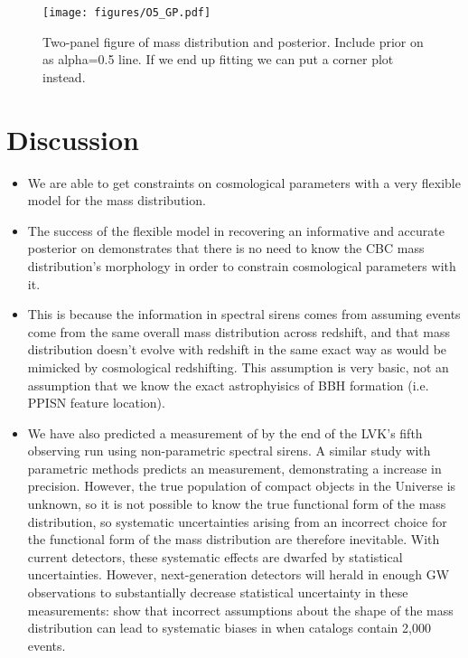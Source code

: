 \documentclass[]{aastex631}
\begin{document}
\begin{figure}
    \centering
    \texttt{[image: figures/O5\_GP.pdf]}
    \caption{Two-panel figure of mass distribution and \Ho{} posterior. 
    Include prior on \Ho{} as alpha=0.5 line. 
    If we end up fitting \Omm{} we can put a corner plot instead.}
    \label{fig:O5_GP}
\end{figure}


\section{Discussion}
\label{sec:discussion}


\begin{itemize}
    \item We are able to get constraints on cosmological parameters with a very flexible model for the mass distribution. 
    \item The success of the flexible model in recovering an informative and accurate posterior on \Ho demonstrates that there is no need to know the CBC mass distribution's morphology in order to constrain cosmological parameters with it.
    \item This is because the information in spectral sirens comes from assuming events come from the same overall mass distribution across redshift, and that mass distribution doesn't evolve with redshift in the same exact way as would be mimicked by cosmological redshifting. This assumption is very basic, not an assumption that we know the exact astrophyisics of BBH formation (i.e. PPISN feature location).
    \item We have also predicted a  measurement of \Ho{} by the end of the LVK's fifth observing run using non-parametric spectral sirens.
A similar study with parametric methods \citep{Chen:2024gdn} predicts an  measurement, demonstrating a  increase in precision.
However, the true population of compact objects in the Universe is unknown, so it is not possible to know the true functional form of the mass distribution, so systematic uncertainties arising from an incorrect choice for the functional form of the mass distribution are therefore inevitable.
With current detectors, these systematic effects are dwarfed by statistical uncertainties.
However, next-generation detectors will herald in enough GW observations to substantially decrease statistical uncertainty in these measurements: \citet{pierra_study_2023} show that incorrect assumptions about the shape of the mass distribution can lead to  systematic biases in \Ho when catalogs contain 2,000 events.

\end{itemize}
\end{document}
